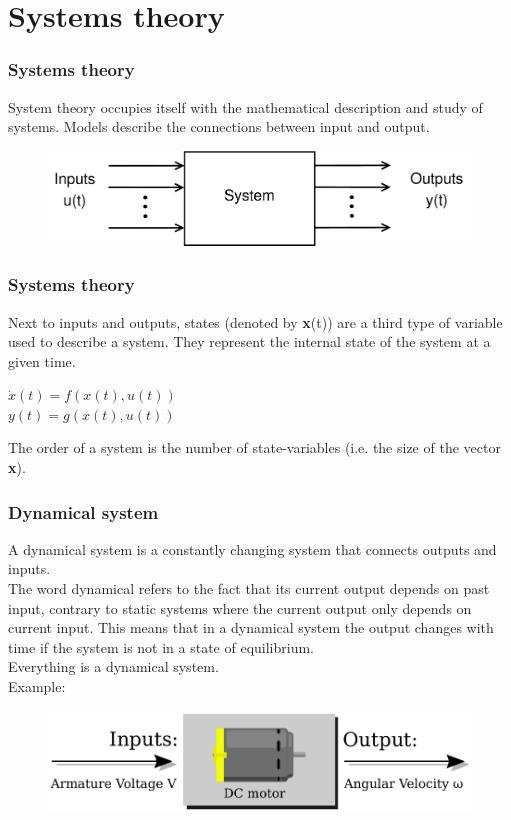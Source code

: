\begin{frame}
	\frametitle{}
\end{frame}

\section{Systems theory} 

\begin{frame}
	\frametitle{Systems theory}
	System theory occupies itself with the mathematical description and study of systems.
	Models describe the connections between input and output.\\
	\bigskip
	\begin{figure}
		\includegraphics[width=.9\linewidth]{systems_theory}
	\end{figure}
	\bigskip
\end{frame}

\begin{frame}
	\frametitle{Systems theory}
	Next to inputs and outputs, states (denoted by \textbf x(t)) are a third type of variable used to describe a system. They represent the internal state of the system at a given time.\\
	\begin{center}
		$\dot{x}(t) = f(x(t),u(t))$\\
		$y(t) = g(x(t),u(t))$\\
	\end{center}
	The order of a system is the number of state-variables (i.e. the size of the vector \textbf x).\\
	\bigskip
\end{frame}

\begin{frame}
	\frametitle{Dynamical system}
	A dynamical system is a constantly changing system that connects outputs and inputs.\\The word dynamical refers to the fact that its current output depends on past input, contrary to static systems where the current output only depends on current input. This means that in a dynamical system the output changes with time if the system is not in a state of equilibrium.\\
	\medskip
	Everything is a dynamical system.\\
	Example:\\
	\begin{figure}
		\includegraphics[width=0.7\linewidth]{dc_motor}
	\end{figure}
\end{frame}

